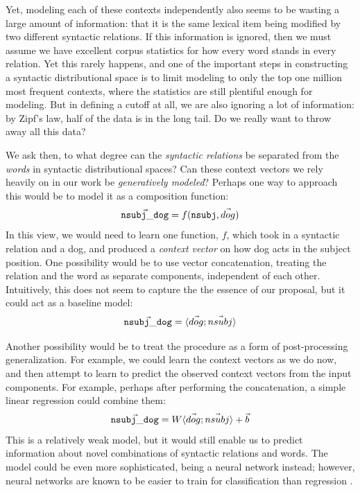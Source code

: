 \documentclass[12pt]{article}
\begin{document}
Yet, modeling each of these contexts independently also seems to be wasting
a large amount of information: that it is the same lexical item being modified
by two different syntactic relations. If this information is ignored, then
we must assume we have excellent corpus statistics for how every word stands
in every relation. Yet this rarely happens, and one of the important
steps in constructing a syntactic distributional space is to limit modeling
to only the top one million most frequent contexts, where the statistics are
still plentiful enough for modeling. But in defining a cutoff at all, we
are also ignoring a lot of information: by Zipf's law, half of the data
is in the long tail. Do we really want to throw away all this data?

We ask then, to what degree can the {\em syntactic relations} be separated
from the {\em words} in syntactic distributional spaces? 
Can these context vectors we rely heavily on in our work be {\em generatively
modeled}? Perhaps one way to approach this would be to model it as a
composition function:
\begin{equation*}
  \vec{ {\tt nsubj\_dog} } = f({\tt nsubj}, \vec{dog})
\end{equation*}
In this view, we would need to learn one function, $f$, which took in a syntactic
relation and a dog, and produced a {\em context vector} on how dog acts in the
subject position. One possibility would be to use vector concatenation,
treating the relation and the word as separate components, independent of each
other. Intuitively, this does not seem to capture the the essence of our
proposal, but it could act as a baseline model:
\begin{equation*}
  \vec{ {\tt nsubj\_dog} } = \langle \vec{dog} ; \vec{nsubj} \rangle
\end{equation*}

Another possibility would be to treat the procedure as a form of post-processing
generalization. For example, we could learn the context vectors as we do now, and
then attempt to learn to predict the observed context vectors from the input
components. For example, perhaps after performing the concatenation, a simple
linear regression could combine them:
\begin{equation*}
  \vec{ {\tt nsubj\_dog} } = W\langle \vec{dog} ; \vec{nsubj} \rangle + \vec{b}
\end{equation*}
This is a relatively weak model, but it would still enable us to predict
information about novel combinations of syntactic relations and words. The
model could be even more sophisticated, being a neural network instead; however,
neural networks are known to be easier to train for classification than
regression \cite{needcite}.
\end{document}
